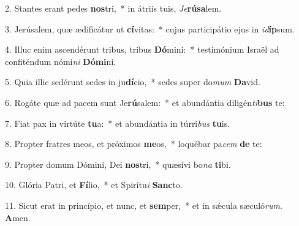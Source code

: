 2. Stantes erant pedes \textbf{nos}tri,~*  in átriis tuis, \textit{Je}\textbf{rú}\textbf{sa}lem.\

3. Jerúsalem, quæ ædificátur ut \textbf{cí}vitas:~*  cujus participátio ejus in \textit{id}\textbf{íp}sum.\

4. Illuc enim ascendérunt tribus, tribus \textbf{Dó}mini:~*  testimónium Israël ad confiténdum nómi\textit{ni} \textbf{Dó}\textbf{mi}ni.\

5. Quia illic sedérunt sedes in ju\textbf{dí}cio,~*  sedes super do\textit{mum} \textbf{Da}vid.\

6. Rogáte quæ ad pacem sunt Je\textbf{rú}salem:~*  et abundántia diligén\textit{ti}\textbf{bus} te:\

7. Fiat pax in virtúte \textbf{tu}a:~*  et abundántia in túrri\textit{bus} \textbf{tu}is.\

8. Propter fratres meos, et próximos \textbf{me}os,~*  loquébar pa\textit{cem} \textbf{de} te:\

9. Propter domum Dómini, Dei \textbf{nos}tri,~*  quæsívi bo\textit{na} \textbf{ti}bi.\

10. Glória Patri, et \textbf{Fí}lio,~*  et Spirítu\textit{i} \textbf{Sanc}to.\

11. Sicut erat in princípio, et nunc, et \textbf{sem}per,~*  et in sǽcula sæculó\textit{rum}. \textbf{A}men.\

